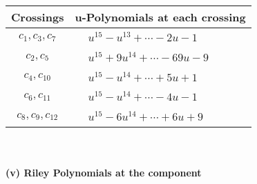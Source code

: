 \documentclass[1p]{elsarticle_modified}
\theoremstyle{definition}
\begin{document}
\begin{tabular}{m{50pt}|m{274pt}}
Crossings & \hspace{64pt}u-Polynomials at each crossing \\
\hline $$\begin{aligned}c_{1},c_{3},c_{7}\end{aligned}$$&$\begin{aligned}
&u^{15}- u^{13}+\cdots-2 u-1
\end{aligned}$\\
\hline $$\begin{aligned}c_{2},c_{5}\end{aligned}$$&$\begin{aligned}
&u^{15}+9 u^{14}+\cdots-69 u-9
\end{aligned}$\\
\hline $$\begin{aligned}c_{4},c_{10}\end{aligned}$$&$\begin{aligned}
&u^{15}- u^{14}+\cdots+5 u+1
\end{aligned}$\\
\hline $$\begin{aligned}c_{6},c_{11}\end{aligned}$$&$\begin{aligned}
&u^{15}- u^{14}+\cdots-4 u-1
\end{aligned}$\\
\hline $$\begin{aligned}c_{8},c_{9},c_{12}\end{aligned}$$&$\begin{aligned}
&u^{15}-6 u^{14}+\cdots+6 u+9
\end{aligned}$\\
\hline
\end{tabular}\\~\\
\newpage\renewcommand{\arraystretch}{1}
\flushleft \textbf{(v) Riley Polynomials at the component}\newline \\
\end{document}
